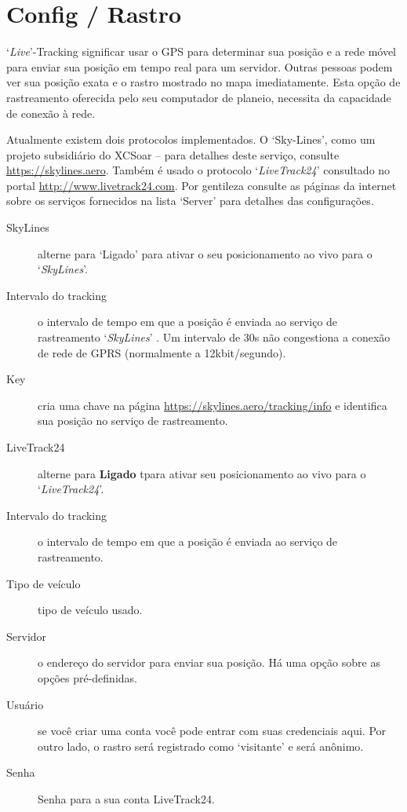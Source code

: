 \section{Config / Rastro}

`{\it Live}'-Tracking significar usar o GPS para determinar sua posição e a rede móvel para enviar sua posição em tempo real para um servidor.  Outras pessoas podem ver sua posição exata e o rastro mostrado no mapa imediatamente.  Esta opção de rastreamento oferecida pelo seu computador de planeio, necessita da capacidade de conexão à rede.  

Atualmente existem dois protocolos implementados. O ‘Sky-Lines’, como um projeto subsidiário do XCSoar – para detalhes deste serviço, consulte
\url{https://skylines.aero}. 
Também é usado o protocolo  `{\em LiveTrack24}' consultado no portal  \url{http://www.livetrack24.com}.  
Por gentileza consulte as páginas da internet sobre os serviços fornecidos na lista ‘Server’ para detalhes das configurações.

\begin{description}
\item[SkyLines]  alterne para ‘Ligado’ para ativar o seu posicionamento ao vivo para o `{\em SkyLines}'.
\item[Intervalo do tracking]  o intervalo de tempo em que a posição é enviada ao serviço de rastreamento  `{\em SkyLines}' .  Um intervalo de 30s não congestiona a conexão de rede de GPRS (normalmente a 12kbit/segundo).
\item[Key]  cria uma chave na página  \url{https://skylines.aero/tracking/info} 
   e identifica sua posição no serviço de rastreamento.
\\
\item[LiveTrack24]  alterne para  {\bf Ligado} tpara ativar seu posicionamento ao vivo para o `{\em LiveTrack24}'.
\item[Intervalo do tracking]  o intervalo de tempo em que a posição é enviada ao serviço de rastreamento.
\item[Tipo de veículo] tipo de veículo usado.
\item[Servidor]  o endereço do servidor para enviar sua posição.  Há uma opção sobre as opções pré-definidas.
\item[Usuário]  se você criar uma conta você pode entrar com suas credenciais aqui.  Por outro lado, o rastro será registrado como ‘visitante’ e será anônimo.
\item[Senha]  Senha para a sua conta LiveTrack24.
\end{description}


